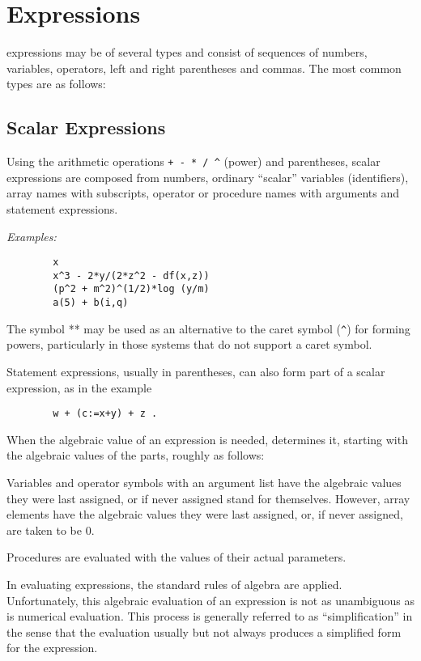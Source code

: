 \chapter{Expressions}

{\REDUCE} expressions may be of several types and consist
of sequences of numbers, variables, operators, left and right parentheses
and commas.  The most common types are as follows:

\section{Scalar Expressions}

Using the arithmetic operations {\tt + - * / \verb|^|}
(power) and parentheses, scalar expressions are composed from numbers,
ordinary ``scalar'' variables (identifiers), array names with subscripts,
operator or procedure names with arguments and statement expressions.

{\it Examples:}
\begin{verbatim}
        x
        x^3 - 2*y/(2*z^2 - df(x,z))
        (p^2 + m^2)^(1/2)*log (y/m)
        a(5) + b(i,q)
\end{verbatim}
The symbol ** may be used as an alternative to the caret symbol (\verb+^+)
for forming powers, particularly in those systems that do not support a
caret symbol.

Statement expressions, usually in parentheses, can also form part of
a scalar expression, as in the example
\begin{verbatim}
        w + (c:=x+y) + z .
\end{verbatim}
When the algebraic value of an expression is needed, {\REDUCE} determines it,
starting with the algebraic values of the parts, roughly as follows:

Variables and operator symbols with an argument list have the algebraic
values they were last assigned, or if never assigned stand for themselves.
However, array elements have the algebraic values they were last assigned,
or, if never assigned, are taken to be 0.

Procedures are evaluated with the values of their actual parameters.

In evaluating expressions, the standard rules of algebra are applied.
Unfortunately, this algebraic evaluation of an expression is not as
unambiguous as is numerical evaluation. This process is generally referred
to as ``simplification'' in the sense that the
evaluation usually but not always produces a simplified form for the
expression.

